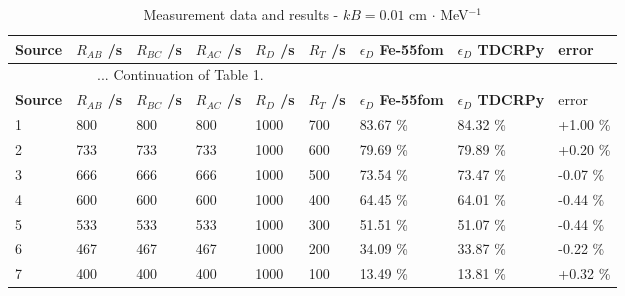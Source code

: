 \documentclass[12pt]{iopart}
\begin{document}
\begingroup
\footnotesize
\begin{longtable}[l]{| p{} | p{} | p{} | p{} | p{} | p{} |p{} |p{} |p{} |} 
\caption{Measurement data and results - $kB = 0.01$ cm $\cdot$ MeV$^{-1}$}
\label{Table1} \\ 
\hline
\textbf{Source} & \textbf{$R_{AB}$ /s} & \textbf{$R_{BC}$ /s} & \textbf{$R_{AC}$ /s} & \textbf{$R_{D}$ /s} & \textbf{$R_{T}$ /s} & \textbf{$\epsilon_{D}$ Fe-55fom} & \textbf{$\epsilon_{D}$ TDCRPy} & error \\ 
\endfirsthead
\multicolumn{6}{c}{... Continuation of Table 1.}\\ 
\hline
 \textbf{Source} & \textbf{$R_{AB}$ /s} & \textbf{$R_{BC}$ /s} & \textbf{$R_{AC}$ /s} & \textbf{$R_{D}$ /s} & \textbf{$R_{T}$ /s} & \textbf{$\epsilon_{D}$ Fe-55fom} & \textbf{$\epsilon_{D}$ TDCRPy} & error \\   \hline 
\endhead
\hline
 1 & 800    & 800     & 800    & 1000    &  700   & 83.67 \% & 84.32 \% & +1.00 \% \\
 2 & 733    & 733     & 733    & 1000    &  600   & 79.69 \% & 79.89 \% & +0.20 \% \\
 3 & 666    & 666     & 666    & 1000    &  500   & 73.54 \% & 73.47 \% & -0.07 \% \\
 4 & 600    & 600     & 600    & 1000    &  400   & 64.45 \% & 64.01 \% & -0.44 \% \\
 5 & 533    & 533     & 533    & 1000    &  300   & 51.51 \% & 51.07 \% & -0.44 \% \\
 6 & 467    & 467     & 467    & 1000    &  200   & 34.09 \% & 33.87 \% & -0.22 \% \\
 7 & 400    & 400     & 400    & 1000    &  100   & 13.49 \% & 13.81 \% & +0.32 \% \\
\hline
\end{longtable} 
\endgroup
\end{document}
